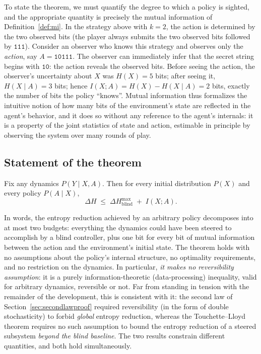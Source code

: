 \documentclass[11pt]{article}
\begin{document}
To state the theorem, we must quantify the degree to which a policy is sighted, and the appropriate quantity is precisely the mutual information of Definition~\ref{def:mi}. In the strategy above with $k = 2$, the action is determined by the two observed bits (the player always submits the two observed bits followed by $\texttt{111}$). Consider an observer who knows this strategy and observes only the \emph{action}, say $A = \texttt{10111}$. The observer can immediately infer that the secret string begins with $\texttt{10}$: the action reveals the observed bits. Before seeing the action, the observer's uncertainty about $X$ was $H(X) = 5$ bits; after seeing it, $H(X \mid A) = 3$ bits; hence $I(X; A) = H(X) - H(X \mid A) = 2$ bits, exactly the number of bits the policy ``knows''. Mutual information thus formalizes the intuitive notion of how many bits of the environment's state are reflected in the agent's behavior, and it does so without any reference to the agent's internals: it is a property of the joint statistics of state and action, estimable in principle by observing the system over many rounds of play.

\subsection{Statement of the theorem}
\label{sec:tlthm}

\begin{theorem}
\label{thm:tl}
Fix any dynamics $P(Y \mid X, A)$. Then for every initial distribution $P(X)$ and every policy $P(A \mid X)$,
\[
\Delta H \;\le\; \Delta H^{\max}_{\mathrm{blind}} \;+\; I(X; A).
\]
\end{theorem}

In words, the entropy reduction achieved by an arbitrary policy decomposes into at most two budgets: everything the dynamics could have been steered to accomplish by a blind controller, plus one bit for every bit of mutual information between the action and the environment's initial state. The theorem holds with no assumptions about the policy's internal structure, no optimality requirements, and no restriction on the dynamics. In particular, \emph{it makes no reversibility assumption}: it is a purely information-theoretic (data-processing) inequality, valid for arbitrary dynamics, reversible or not. Far from standing in tension with the remainder of the development, this is consistent with it: the second law of Section~\ref{sec:secondlawproof} required reversibility (in the form of double stochasticity) to forbid \emph{global} entropy reduction, whereas the Touchette--Lloyd theorem requires no such assumption to bound the entropy reduction of a steered subsystem \emph{beyond the blind baseline}. The two results constrain different quantities, and both hold simultaneously.
\end{document}
